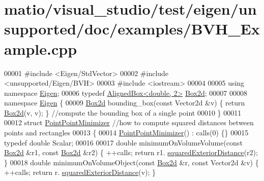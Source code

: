 \hypertarget{matio_2visual__studio_2test_2eigen_2unsupported_2doc_2examples_2_b_v_h___example_8cpp_source}{}\section{matio/visual\+\_\+studio/test/eigen/unsupported/doc/examples/\+B\+V\+H\+\_\+\+Example.cpp}
\label{matio_2visual__studio_2test_2eigen_2unsupported_2doc_2examples_2_b_v_h___example_8cpp_source}

\begin{DoxyCode}
00001 \textcolor{preprocessor}{#include <Eigen/StdVector>}
00002 \textcolor{preprocessor}{#include <unsupported/Eigen/BVH>}
00003 \textcolor{preprocessor}{#include <iostream>}
00004 
00005 \textcolor{keyword}{using namespace }\hyperlink{namespace_eigen}{Eigen};
00006 \textcolor{keyword}{typedef} \hyperlink{group___geometry___module_class_eigen_1_1_aligned_box}{AlignedBox<double, 2>} \hyperlink{group___geometry___module_class_eigen_1_1_aligned_box}{Box2d};
00007 
00008 \textcolor{keyword}{namespace }\hyperlink{namespace_eigen}{Eigen} \{
00009   \hyperlink{group___geometry___module_class_eigen_1_1_aligned_box}{Box2d} bounding\_box(\textcolor{keyword}{const} Vector2d &v) \{ \textcolor{keywordflow}{return} \hyperlink{group___geometry___module_class_eigen_1_1_aligned_box}{Box2d}(v, v); \} \textcolor{comment}{//compute the bounding box of a
       single point}
00010 \}
00011 
00012 \textcolor{keyword}{struct }\hyperlink{struct_point_point_minimizer}{PointPointMinimizer} \textcolor{comment}{//how to compute squared distances between points and
       rectangles}
00013 \{
00014   \hyperlink{struct_point_point_minimizer}{PointPointMinimizer}() : calls(0) \{\}
00015   \textcolor{keyword}{typedef} \textcolor{keywordtype}{double} Scalar;
00016 
00017   \textcolor{keywordtype}{double} minimumOnVolumeVolume(\textcolor{keyword}{const} \hyperlink{group___geometry___module_class_eigen_1_1_aligned_box}{Box2d} &r1, \textcolor{keyword}{const} \hyperlink{group___geometry___module_class_eigen_1_1_aligned_box}{Box2d} &r2) \{ ++calls; \textcolor{keywordflow}{return} r1.
      \hyperlink{group___geometry___module_aa6d9ffc81bd77da631fef6559f45cf13}{squaredExteriorDistance}(r2); \}
00018   \textcolor{keywordtype}{double} minimumOnVolumeObject(\textcolor{keyword}{const} \hyperlink{group___geometry___module_class_eigen_1_1_aligned_box}{Box2d} &r, \textcolor{keyword}{const} Vector2d &v) \{ ++calls; \textcolor{keywordflow}{return} r.
      \hyperlink{group___geometry___module_aa6d9ffc81bd77da631fef6559f45cf13}{squaredExteriorDistance}(v); \}

\end{DoxyCode}
